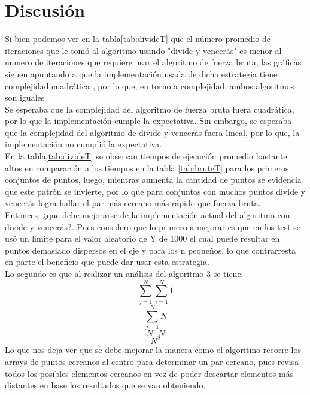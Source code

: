 \section{Discusión}
Si bien podemos ver en la tabla\ref{tab:divideT} que el número promedio de iteraciones que le tomó al algoritmo usando "divide y vencerás" es menor al numero de iteraciones que requiere usar el algoritmo de fuerza bruta, las gráficas siguen apuntando a que la implementación usada de dicha estrategia tiene complejidad cuadrática , por lo que, en torno a complejidad, ambos algoritmos son iguales\\

Se esperaba que la complejidad del algoritmo de fuerza bruta fuera cuadrática, por lo que la implementación cumple la expectativa. Sin embargo, se esperaba que la complejidad del algoritmo de divide y vencerás fuera lineal, por lo que, la implementación no cumplió la expectativa.\\

En la tabla\ref{tab:divideT} se observan tiempos de ejecución promedio bastante altos en comparación a los tiempos en la tabla \ref{tab:bruteT} para los primeros conjuntos de puntos, luego, mientras aumenta la cantidad de puntos se evidencia que este patrón se invierte, por lo que para conjuntos con muchos puntos divide y vencerás logra hallar el par más cercano más rápido que fuerza bruta.\\

Entonces, ¿que debe mejorarse de la implementación actual del algoritmo con divide y vencerás?. Pues considero que lo primero a mejorar es que en los test se usó un limite para el valor aleatorio de Y de 1000 el cual puede resultar en puntos demasiado dispersos en el eje y para los n pequeños, lo que contrarresta en parte el beneficio que puede dar usar esta estrategia.\\

Lo segundo es que al realizar un análisis del algoritmo 3 se tiene:\\
$$\sum_{j = 1}^{N}\sum_{i=1}^{N}1$$
$$\sum_{j = 1}^{N}N$$
$$N \cdot N$$
$$N^2$$
Lo que nos deja ver que se debe mejorar la manera como el algoritmo recorre los arrays de puntos cercanos al centro para determinar un par cercano, pues revisa todos los posibles elementos cercanos en vez de poder descartar elementos más distantes en base los resultados que se van obteniendo.